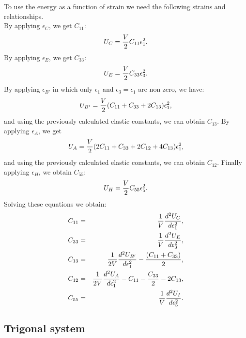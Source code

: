 \documentclass[12pt,a4paper,twoside]{report}
\begin{document}
To use the energy as a function of strain 
we need the following strains and relationships. \\
By applying $\epsilon_C$, we get $C_{11}$:
\begin{equation}
U_C= {V \over 2} C_{11} \epsilon_1^2.
\end{equation}
By applying $\epsilon_E$, we get $C_{33}$:
\begin{equation}
U_E= {V \over 2} C_{33} \epsilon_3^2.
\end{equation}
By applying $\epsilon_{B'}$ in which only $\epsilon_1$ and 
$\epsilon_3=\epsilon_1$ are non zero, we have:
\begin{equation}
U_{B'}= {V \over 2} (C_{11} + C_{33} + 2 C_{13}) \epsilon_1^2,
\end{equation}
and using the previously calculated elastic constants, we can obtain $C_{13}$.
By applying $\epsilon_A$, we get
\begin{equation}
U_A= {V \over 2} (2C_{11} + C_{33} + 2 C_{12} + 4 C_{13}) \epsilon_1^2,
\end{equation}
and using the previously calculated elastic constants, we can obtain $C_{12}$.
Finally applying $\epsilon_H$, we obtain $C_{55}$:
\begin{equation}
U_H= {V \over 2} C_{55} \epsilon_5^2.
\end{equation}
Solving these equations we obtain:
\begin{eqnarray}
C_{11}&=&{1 \over V} {d^2 U_C \over d \epsilon_1^2}, \\ 
C_{33}&=&{1 \over V} {d^2 U_E \over d \epsilon_3^2}, \\ 
C_{13}&=&{1 \over 2 V} {d^2 U_{B'} \over d \epsilon_1^2} - 
{(C_{11} + C_{33})\over 2}, \\
C_{12}&=&{1 \over 2 V} {d^2 U_A \over d \epsilon_1^2} - C_{11} - 
{C_{33} \over 2} - 2 C_{13}, \\
C_{55}&=&{1 \over V} {d^2 U_I \over d \epsilon_5^2}. \\
\end{eqnarray}

{\color{web-blue}\subsection{Trigonal system}}
\color{black}
\end{document}
